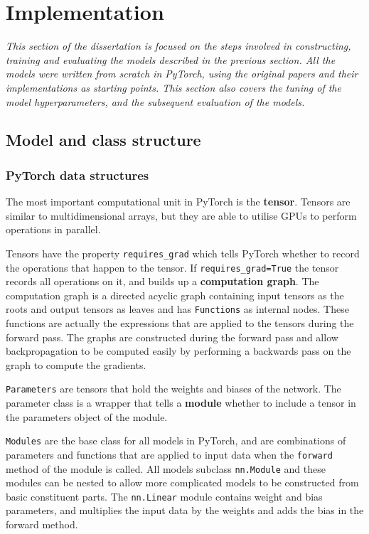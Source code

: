 \chapter{Implementation}

\textit{This section of the dissertation is focused on the steps involved in constructing, training and evaluating the models 
described in the previous section.
All the models were written from scratch in PyTorch, using the original papers and their implementations as starting points.
This section also covers the tuning of the model hyperparameters, and the subsequent evaluation of the models.}

\section{Model and class structure}

\subsection{PyTorch data structures}
The most important computational unit in PyTorch is the \textbf{tensor}. Tensors are similar to multidimensional arrays, but they are able to 
utilise GPUs to perform operations in parallel.

Tensors have the property \texttt{requires\_grad} which tells PyTorch whether to record the operations that happen to the tensor. If 
\texttt{requires\_grad=True} the tensor records all operations on it, and builds up a \textbf{computation graph}. The computation graph is a 
directed acyclic graph containing input tensors as the roots and output
tensors as leaves and has \texttt{Functions} as internal nodes. These functions are actually the expressions that are applied to the 
tensors during the forward pass. The graphs are constructed during the forward pass and allow backpropagation to be computed easily by performing a 
backwards pass on the graph to compute the gradients.

\texttt{Parameters} are tensors that hold the weights and biases of the network. The parameter class is a 
wrapper that tells a \textbf{module} whether to include a tensor in the parameters object of the module.

\texttt{Modules} are the base class for all models in PyTorch, and are combinations of parameters and functions that are applied to input 
data when the \texttt{forward} method of the module is called. All models subclass \texttt{nn.Module} and these modules can be nested
to allow more complicated models to be constructed from basic constituent parts. The \texttt{nn.Linear} module contains 
weight and bias parameters, and multiplies the input data by the weights and adds the bias in the forward method.

